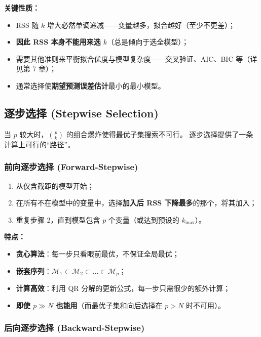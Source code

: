 \textbf{关键性质：}
\begin{itemize}
    \item RSS 随 $k$ 增大必然单调递减——变量越多，拟合越好（至少不更差）；
    \item \textbf{因此 RSS 本身不能用来选 $k$}（总是倾向于选全模型）；
    \item 需要其他准则来平衡拟合优度与模型复杂度——交叉验证、AIC、BIC 等（详见第 7 章）；
    \item 通常选择使\textbf{期望预测误差估计}最小的最小模型。
\end{itemize}

\subsection{逐步选择 (Stepwise Selection)}

当 $p$ 较大时，$\binom{p}{k}$ 的组合爆炸使得最优子集搜索不可行。
逐步选择提供了一条计算上可行的``路径''。

\subsubsection{前向逐步选择 (Forward-Stepwise)}

\begin{enumerate}[label=第 \arabic* 步：, leftmargin=*]
    \item 从仅含截距的模型开始；
    \item 在所有不在模型中的变量中，选择\textbf{加入后 RSS 下降最多}的那个，将其加入；
    \item 重复步骤 2，直到模型包含 $p$ 个变量（或达到预设的 $k_{\max}$）。
\end{enumerate}

\textbf{特点：}
\begin{itemize}
    \item \textbf{贪心算法}：每一步只看眼前最优，不保证全局最优；
    \item \textbf{嵌套序列}：$\mathcal{M}_1 \subset \mathcal{M}_2 \subset \dots \subset \mathcal{M}_p$；
    \item \textbf{计算高效}：利用 QR 分解的更新公式，每一步只需很少的额外计算；
    \item \textbf{即使 $p \gg N$ 也能用}（而最优子集和向后选择在 $p > N$ 时不可用）。
\end{itemize}

\subsubsection{后向逐步选择 (Backward-Stepwise)}

